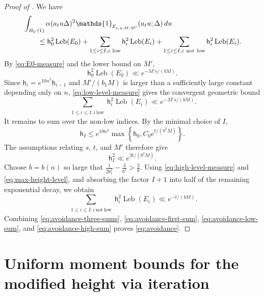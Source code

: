\documentclass[reqno,11pt]{amsart}
\numberwithin{equation}{section}
\theoremstyle{definition}
\theoremstyle{remark}
\begin{document}
\begin{proof}[Proof of ]
We have
\begin{align}
&\int_{B_{U}(1)}
\alpha(a_tu\Delta)^2
\mathds{1}_{\mathcal E_{s,\eta,M,M'}}
(a_tu;\Delta)\,du
\notag\\
&\qquad\le
\mathsf{h}_0^2\operatorname{Leb}(E_0) +
\sum_{\substack{1\le i\le I, i\ \mathrm{low}}}
\mathsf{h}_i^2\operatorname{Leb}(E_i)
+
\sum_{\substack{1\le i\le I, i\ \mathrm{not\ low}}}
\mathsf{h}_i^2\operatorname{Leb}(E_i).
\label{eq:avoidance-three-sums}
\end{align}
By \eqref{eq:E0-measure} and the lower bound on $M'$,
\begin{equation}\label{eq:avoidance-first-sum}
\mathsf{h}_0^2\operatorname{Leb}(E_0)
\ll e^{-M's/(bM)}.
\end{equation}
Since $\mathsf{h}_i=e^{10n^3}\mathsf{h}_{i-1}$ and
$M'/(b_1M)$ is larger than a sufficiently large constant depending only
on $n$, \eqref{eq:low-level-measure} gives the convergent geometric bound
\begin{equation}\label{eq:avoidance-low-sum}
\sum_{\substack{1\le i\le I, i\ \mathrm{low}}}
\mathsf{h}_i^2\operatorname{Leb}(E_i)
\ll e^{-M's/(bM)}.
\end{equation}
It remains to sum over the non-low indices. By the minimal choice of $I$,
$$
\mathsf{h}_I\le e^{10n^3}\max\left\{\mathsf{h}_0,C_0e^{t/(b^2M)}\right\}.
$$
The assumptions relating $s$, $t$, and $M'$ therefore give
\begin{equation}\label{eq:max-height-level}
\mathsf{h}_I^2
\ll e^{{3t}/({b^2M})}.
\end{equation}
Choose $b=b(n)$ so large that $\frac{1}{2b_1^2}-\frac{3}{b^2}
>\frac{2}{b}$. Using \eqref{eq:high-level-measure} and
\eqref{eq:max-height-level}, and absorbing the factor $I+1$ into half of
the remaining exponential decay, we obtain
\begin{equation}\label{eq:avoidance-high-sum}
\sum_{\substack{1\le i\le I,  i\ \mathrm{not\ low}}}
\mathsf{h}_i^2\operatorname{Leb}(E_i)
\ll e^{-t/(bM)}.
\end{equation}
Combining
\eqref{eq:avoidance-three-sums},
\eqref{eq:avoidance-first-sum},
\eqref{eq:avoidance-low-sum}, and
\eqref{eq:avoidance-high-sum} proves \eqref{eq:avoidance}.
\end{proof}

\section{Uniform moment bounds for the modified height via iteration}
\label{s:iterations}
\end{document}
